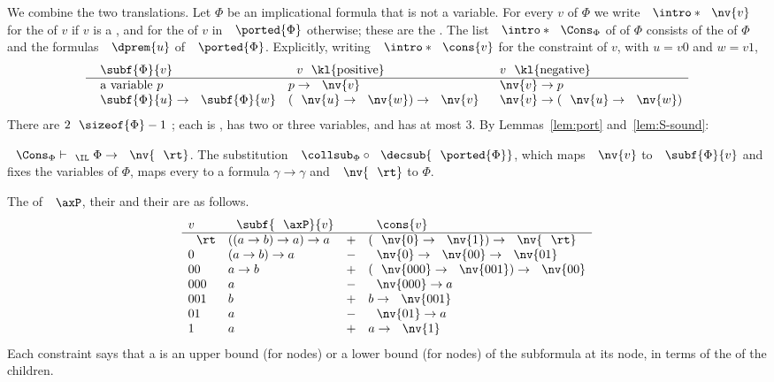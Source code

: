 \AP We combine the two translations. Let $\Phi$ be an implicational formula
that is not a variable. For every  $v$ of $\Phi$ we write
$\intro*\nv{v}$ for the  of $v$ if $v$ is a , and for the
 of $v$ in $\ported{\Phi}$ otherwise; these are the
. \AP The list $\intro*\Cons_\Phi$ of  of $\Phi$ consists of the  of $\Phi$ and the
formulas $\dprem{u}$ of $\ported{\Phi}$. Explicitly, writing
$\intro*\cons{v}$ for the constraint of $v$, with $u=v0$ and $w=v1$,
\[
\begin{array}{lll}
\subf{\Phi}{v} & \text{$v$ \kl{positive}} & \text{$v$ \kl{negative}}\\\hline
\text{a variable }p & p\to\nv{v} & \nv{v}\to p\\
\subf{\Phi}{u}\to\subf{\Phi}{w} & (\nv{u}\to\nv{w})\to\nv{v} & \nv{v}\to(\nv{u}\to\nv{w})
\end{array}
\]
There are $2\sizeof{\Phi}-1$ ; each is ,
has two or three variables, and has  at most $3$. By
Lemmas~\ref{lem:port} and~\ref{lem:S-sound}:

\begin{lemma}\label{lem:constraints}
$\Cons_\Phi\vdash_{\IL}\Phi\to\nv{\rt}$. The substitution
$\collsub_\Phi\circ\decsub{\ported{\Phi}}$, which maps $\nv{v}$ to
$\subf{\Phi}{v}$ and fixes the variables of $\Phi$, maps every  to a formula $\gamma\to\gamma$ and $\nv{\rt}$ to $\Phi$.
\end{lemma}

\begin{example}\label{ex:P-constraints}
The  of $\axP$, their  and their  are as follows.
\[
\begin{array}{llll}
v & \subf{\axP}{v} & & \cons{v}\\\hline
\rt & ((a\to b)\to a)\to a & + & (\nv{0}\to\nv{1})\to\nv{\rt}\\
0 & (a\to b)\to a & - & \nv{0}\to\nv{00}\to\nv{01}\\
00 & a\to b & + & (\nv{000}\to\nv{001})\to\nv{00}\\
000 & a & - & \nv{000}\to a\\
001 & b & + & b\to\nv{001}\\
01 & a & - & \nv{01}\to a\\
1 & a & + & a\to\nv{1}
\end{array}
\]
Each constraint says that a  is an upper bound (for
 nodes) or a lower bound (for  nodes) of the
subformula at its node, in terms of the  of the children.
\end{example}

